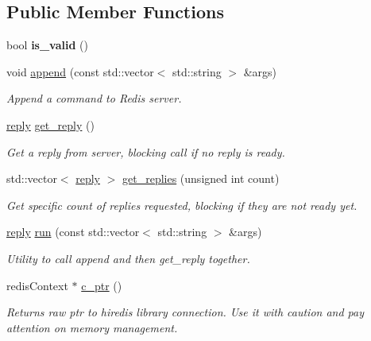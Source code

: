 \subsection*{Public Member Functions}
\begin{DoxyCompactItemize}
\item 
\hypertarget{classredis3m_1_1connection_a8ab5fc0ed61431b65220d2b389e8357e}{bool {\bfseries is\-\_\-valid} ()}\label{classredis3m_1_1connection_a8ab5fc0ed61431b65220d2b389e8357e}

\item 
void \hyperlink{classredis3m_1_1connection_a308ac2576c2dd1c8ce6e97c4572c86f5}{append} (const std\-::vector$<$ std\-::string $>$ \&args)
\begin{DoxyCompactList}\small\item\em Append a command to Redis server. \end{DoxyCompactList}\item 
\hyperlink{classredis3m_1_1reply}{reply} \hyperlink{classredis3m_1_1connection_a0c01abebb9be6368d3d159d30522e8c2}{get\-\_\-reply} ()
\begin{DoxyCompactList}\small\item\em Get a reply from server, blocking call if no reply is ready. \end{DoxyCompactList}\item 
std\-::vector$<$ \hyperlink{classredis3m_1_1reply}{reply} $>$ \hyperlink{classredis3m_1_1connection_a4a346751b7b4f47f5a5d702ad10b2490}{get\-\_\-replies} (unsigned int count)
\begin{DoxyCompactList}\small\item\em Get specific count of replies requested, blocking if they are not ready yet. \end{DoxyCompactList}\item 
\hyperlink{classredis3m_1_1reply}{reply} \hyperlink{classredis3m_1_1connection_ab2690e664a0f0bd4647be5b0f07f988b}{run} (const std\-::vector$<$ std\-::string $>$ \&args)
\begin{DoxyCompactList}\small\item\em Utility to call append and then get\-\_\-reply together. \end{DoxyCompactList}\item 
redis\-Context $\ast$ \hyperlink{classredis3m_1_1connection_a7c583cf358ea3d4b20583670280072ae}{c\-\_\-ptr} ()
\begin{DoxyCompactList}\small\item\em Returns raw ptr to hiredis library connection. Use it with caution and pay attention on memory management. \end{DoxyCompactList}\end{DoxyCompactItemize}
